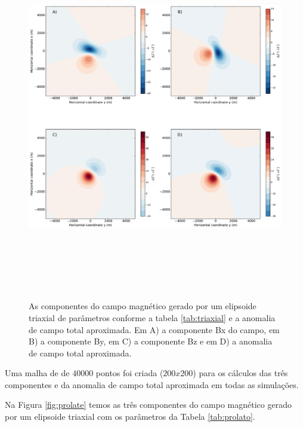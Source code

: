 \begin{figure}[hbt!]
	\centering \includegraphics[width=16cm,height=16cm]{figures/ellipsoid_triaxial}
	\caption[As componentes do campo magnético gerado por um elipsoide triaxial e a anomalia de campo total aproximada.]{As componentes 
	do campo magnético gerado por um elipsoide triaxial de parâmetros conforme a tabela \ref{tab:triaxial} e a anomalia de campo total aproximada. Em A) a componente Bx do campo, em B) a componente By, em C) a componente Bz e em D) a anomalia de campo total aproximada.}
	\label{fig:triaxial}
\end{figure}

Uma malha de de $40000$ pontos foi criada ($200x200$) para os cálculos das três componentes e da anomalia de campo total aproximada em todas as simulações.

Na Figura \ref{fig:prolate} temos as três componentes do campo magnético gerado por um elipsoide triaxial com os parâmetros da Tabela \ref{tab:prolato}.

